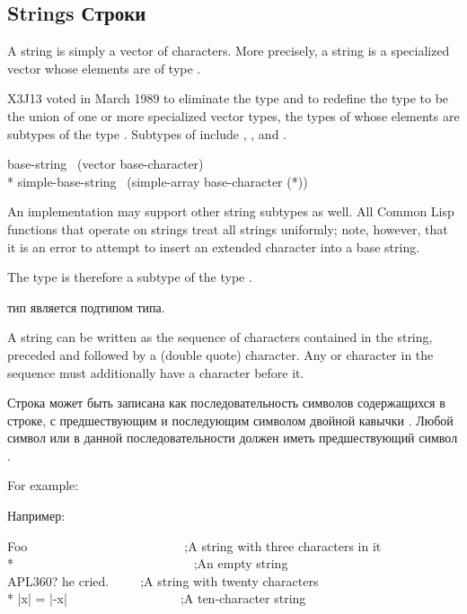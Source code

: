 \subsection{Strings Строки}
\label{STRING-TYPE-SECTION}

\begin{obsolete}
A string is simply a vector of characters.
More precisely, a string is a specialized vector whose elements
are of type .
\end{obsolete}
\begin{newer}
X3J13 voted in March 1989 
to eliminate the type  and to redefine the type
 to be the union of one or more specialized vector
types, the types of whose elements are subtypes of the type .
Subtypes of  include , ,
and .

\vskip 3pt
\begin{lisp}
base-string \EQ\ (vector base-character) \\*
simple-base-string \EQ\ (simple-array base-character (*))
\end{lisp}
An implementation may support
other string subtypes as well.  All Common Lisp functions that operate
on strings treat all strings uniformly; note, however,
that it is an error to attempt to insert
an extended character into a base string.
\end{newer}

\newpage%

The type  is therefore a subtype of the type .

 тип является подтипом  типа.

A string can be written as the sequence of characters contained in the
string, preceded and followed by a \cd{{\Xdquote}} (double quote) character.
Any \cd{{\Xdquote}} or \cd{{\Xbackslash}} character in the sequence must additionally
have a \cd{{\Xbackslash}} character before it.

Строка может быть записана как последовательность символов содержащихся в
строке, с предшествующим и последующим символом двойной кавычки \cd{{\Xdquote}}.
Любой символ \cd{{\Xdquote}} или \cd{{\Xbackslash}} в данной последовательности должен
иметь предшествующий символ \cd{{\Xbackslash}}.

For example:

Например:
\begin{lisp}
{\Xdquote}Foo{\Xdquote}~~~~~~~~~~~~~~~~~~~~~~~~~;{\rm A string with three characters in it} \\*
{\Xdquote}{\Xdquote}~~~~~~~~~~~~~~~~~~~~~~~~~~~~;{\rm An empty string} \\
{\Xdquote}{\Xbackslash}{\Xdquote}APL{\Xbackslash}{\Xbackslash}360?{\Xbackslash}{\Xdquote} he cried.{\Xdquote}~~~~~;{\rm A string with twenty characters} \\*
{\Xdquote}|x| = |-x|{\Xdquote}~~~~~~~~~~~~~~~~~~;{\rm A ten-character string}
\end{lisp}

